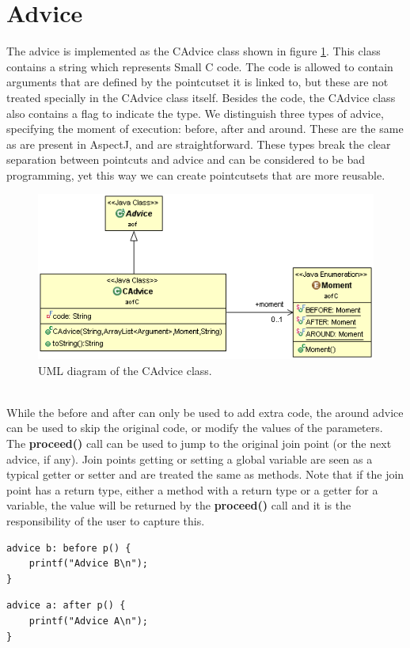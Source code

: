 \documentclass[a4paper]{report}
\begin{document}
\section{Advice}
The advice is implemented as the CAdvice class shown in figure \ref{fig:CAdvice}. This class contains a string which represents Small C code. The code is allowed to contain arguments that are defined by the pointcutset it is linked to, but these are not treated specially in the CAdvice class itself. Besides the code, the CAdvice class also contains a flag to indicate the type. We distinguish three types of advice, specifying the moment of execution: before, after and around. These are the same as are present in AspectJ, and are straightforward. These types break the clear separation between pointcuts and advice and can be considered to be bad programming, yet this way we can create pointcutsets that are more reusable.\\
\begin{figure}[h!]
\centering
\includegraphics[scale=0.7]{images/AOFC/CAdvice.png}
\caption{UML diagram of the CAdvice class.}
\label{fig:CAdvice}
\end{figure}
\\
While the before and after can only be used to add extra code, the around advice can be used to skip the original code, or modify the values of the parameters. The \textbf{proceed()} call can be used to jump to the original join point (or the next advice, if any). Join points getting or setting a global variable are seen as a typical getter or setter and are treated the same as methods. Note that if the join point has a return type, either a method with a return type or a getter for a variable, the value will be returned by the \textbf{proceed()} call and it is the responsibility of the user to capture this.\\
\begin{minipage}{0.42\textwidth}
\begin{lstlisting}[caption=Example of a before advice., label=lst:SmallC_BeforeAdvice]
advice b: before p() {
	printf("Advice B\n");
}
\end{lstlisting}
\begin{lstlisting}[caption=Example of an after advice., label=lst:SmallC_AfterAdvice]
advice a: after p() {
	printf("Advice A\n");
}
\end{lstlisting}
\end{minipage}\hfill
\end{document}
